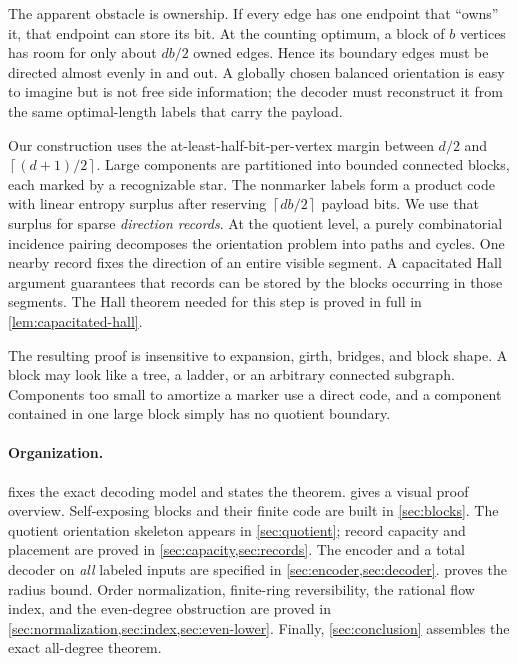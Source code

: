 \documentclass[11pt]{article}
\theoremstyle{definition}
\theoremstyle{remark}
\newcommand{\ceil}[1]{\left\lceil #1\right\rceil}
\begin{document}
The apparent obstacle is ownership.  If every edge has one endpoint that
``owns'' it, that endpoint can store its bit.  At the counting optimum, a
block of $b$ vertices has room for only about $db/2$ owned edges.  Hence its
boundary edges must be directed almost evenly in and out.  A globally chosen
balanced orientation is easy to imagine but is not free side information;
the decoder must reconstruct it from the same optimal-length labels that
carry the payload.

Our construction uses the at-least-half-bit-per-vertex margin between
$d/2$ and $\ceil{(d+1)/2}$.  Large components are partitioned into bounded connected
blocks, each marked by a recognizable star.  The nonmarker labels form a
product code with linear entropy surplus after reserving $\ceil{db/2}$
payload bits.  We use that surplus for sparse 
\emph{direction records}.  At the quotient level, a purely combinatorial
incidence pairing decomposes the orientation problem into paths and cycles.
One nearby record fixes the direction of an entire visible segment.  A
capacitated Hall argument guarantees that records can be stored by the
blocks occurring in those segments.  The Hall theorem needed for this step
is proved in full in \cref{lem:capacitated-hall}.

The resulting proof is insensitive to expansion, girth, bridges, and block
shape.  A block may look like a tree, a ladder, or an arbitrary connected
subgraph.  Components too small to amortize a marker use a direct code, and a
component contained in one large block simply has no quotient boundary.

\paragraph{Organization.}
 fixes the exact decoding model and states the theorem.
 gives a visual proof overview.  Self-exposing blocks and
their finite code are built in \cref{sec:blocks}.  The quotient orientation
skeleton appears in \cref{sec:quotient}; record capacity and placement are
proved in \cref{sec:capacity,sec:records}.  The encoder and a total decoder
on \emph{all} labeled inputs are specified in
\cref{sec:encoder,sec:decoder}.   proves the radius bound.
Order normalization,
finite-ring reversibility, the rational flow index, and the even-degree
obstruction are proved in
\cref{sec:normalization,sec:index,sec:even-lower}.  Finally,
\cref{sec:conclusion} assembles the exact all-degree theorem.
\end{document}
